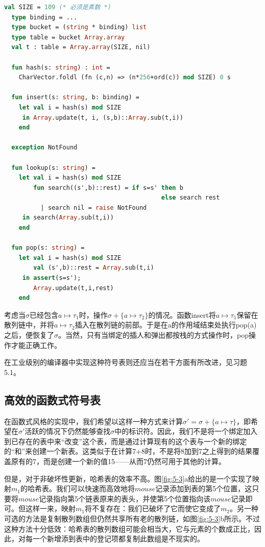 \documentclass[cn,11pt,chinese]{elegantbook}
\begin{document}
\begin{lstlisting}[language=ml,caption={带有外部散列链的哈希表},label={code:5-2}]
  val SIZE = 109 (* 必须是素数 *)
  type binding = ...
  type bucket = (string * binding) list
  type table = bucket Array.array
  val t : table = Array.array(SIZE, nil)

  fun hash(s: string) : int =
    CharVector.foldl (fn (c,n) => (n*256+ord(c)) mod SIZE) 0 s

  fun insert(s: string, b: binding) =
    let val i = hash(s) mod SIZE
     in Array.update(t, i, (s,b)::Array.sub(t,i))
    end

  exception NotFound

  fun lookup(s: string) =
    let val i = hash(s) mod SIZE
        fun search((s',b)::rest) = if s=s' then b
                                           else search rest
          | search nil = raise NotFound
     in search(Array.sub(t,i))
    end

  fun pop(s: string) =
    let val i = hash(s) mod SIZE
        val (s',b)::rest = Array.sub(t,i)
     in assert(s=s');
        Array.update(t,i,rest)
    end
\end{lstlisting}

考虑当$\sigma$已经包含$a\mapsto\tau_1$时，操作$\sigma+\{a\mapsto\tau_2\}$的情况。函数insert将$a\mapsto\tau_1$保留在散列链中，并将$a\mapsto\tau_2$插入在散列链的前部。于是在a的作用域结束处执行pop(a)之后，便恢复了$\sigma$。当然，只有当绑定的插人和弹出都按栈的方式操作时，pop操作才能正确工作。

在工业级别的编译器中实现这种符号表则还应当在若干方面有所改进，见习题5.1。

\subsection{高效的函数式符号表}

在函数式风格的实现中，我们希望以这样一种方式来计算$\sigma'=\sigma+\{a\mapsto\tau\}$，即希望在$\sigma'$活跃的情况下仍然能够查找$\sigma$中的标识符。因此，我们不是将一个绑定加入到已存在的表中来“改变”这个表，而是通过计算现有的这个表与一个新的绑定的“和”来创建一个新表。这类似于在计算7+8时，不是将8加到7之上得到的结果覆盖原有的7，而是创建一个新的值15——从而7仍然可用于其他的计算。

但是，对于非破坏性更新，哈希表的效率不高。图\ref{fig:5-3}a给出的是一个实现了映射$m_1$的哈希表。我们可以快速而高效地将$mouse$记录添加到表的第5个位置，这只要将$mouse$记录指向第5个链表原来的表头，并使第5个位置指向该$mouse$记录即可。但这样一来，映射$m_1$将不复存在：我们已破坏了它而使它变成了$m_2$。另一种可选的方法是复制散列数组但仍然共享所有老的散列链，如图\ref{fig:5-3}b所示。不过这种方法十分低效：哈希表的散列数组可能会相当大，它与元素的个数成正比，因此，对每一个新增添到表中的登记项都复制此数组是不现实的。
\end{document}
